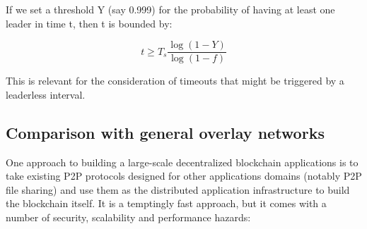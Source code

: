 \documentclass[11pt,a4paper]{article}
\begin{document}
If we set a threshold Y (say 0.999) for the probability of having at
least one leader in time t, then t is bounded by:

\begin{equation*}
t \geq T_{s}\frac{\log(1 - Y)}{\log(1 - f)}
\end{equation*}

This is relevant for the consideration of timeouts that might be
triggered by a leaderless interval.

\subsection{Comparison with general overlay networks}
\label{comparison-with-general-overlay-networks}

One approach to building a large-scale decentralized blockchain
applications is to take existing P2P protocols designed for other
applications domains (notably P2P file sharing) and use them as the
distributed application infrastructure to build the blockchain itself.
It is a temptingly fast approach, but it comes with a number of
security, scalability and performance hazards:
\end{document}

